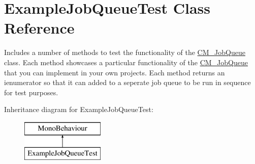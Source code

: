 \hypertarget{class_example_job_queue_test}{}\section{Example\+Job\+Queue\+Test Class Reference}
\label{class_example_job_queue_test}


Includes a number of methods to test the functionality of the \hyperlink{class_c_m___job_queue}{C\+M\+\_\+\+Job\+Queue} class. Each method showcases a particular functionality of the \hyperlink{class_c_m___job_queue}{C\+M\+\_\+\+Job\+Queue} that you can implement in your own projects. Each method returns an ienumerator so that it can added to a seperate job queue to be run in sequence for test purposes.  


Inheritance diagram for Example\+Job\+Queue\+Test\+:\begin{figure}[H]
\begin{center}
\leavevmode
\includegraphics[height=2.000000cm]{class_example_job_queue_test}
\end{center}
\end{figure}
